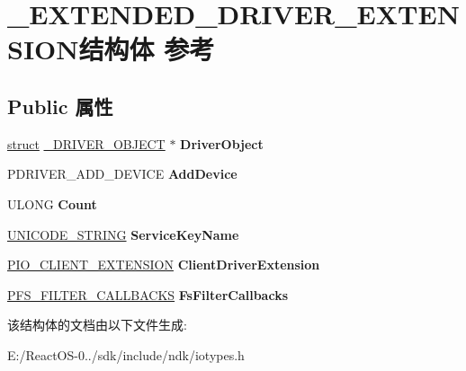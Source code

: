\hypertarget{struct___e_x_t_e_n_d_e_d___d_r_i_v_e_r___e_x_t_e_n_s_i_o_n}{}\section{\+\_\+\+E\+X\+T\+E\+N\+D\+E\+D\+\_\+\+D\+R\+I\+V\+E\+R\+\_\+\+E\+X\+T\+E\+N\+S\+I\+O\+N结构体 参考}
\label{struct___e_x_t_e_n_d_e_d___d_r_i_v_e_r___e_x_t_e_n_s_i_o_n}
\subsection*{Public 属性}
\begin{DoxyCompactItemize}
\item 
\mbox{\label{struct___e_x_t_e_n_d_e_d___d_r_i_v_e_r___e_x_t_e_n_s_i_o_n_aedc5d7256e7f0bcfb8a95cfa5c8cd61e}} 
\hyperlink{interfacestruct}{struct} \hyperlink{struct___d_r_i_v_e_r___o_b_j_e_c_t}{\+\_\+\+D\+R\+I\+V\+E\+R\+\_\+\+O\+B\+J\+E\+CT} $\ast$ {\bfseries Driver\+Object}
\item 
\mbox{\label{struct___e_x_t_e_n_d_e_d___d_r_i_v_e_r___e_x_t_e_n_s_i_o_n_ae2adf99c5f58ac6794d9f736a7b7345d}} 
P\+D\+R\+I\+V\+E\+R\+\_\+\+A\+D\+D\+\_\+\+D\+E\+V\+I\+CE {\bfseries Add\+Device}
\item 
\mbox{\label{struct___e_x_t_e_n_d_e_d___d_r_i_v_e_r___e_x_t_e_n_s_i_o_n_a3b80b7eeec3569eb4e3c4ef079176b1c}} 
U\+L\+O\+NG {\bfseries Count}
\item 
\mbox{\label{struct___e_x_t_e_n_d_e_d___d_r_i_v_e_r___e_x_t_e_n_s_i_o_n_afbf0324b233284bc1b492b0794da202a}} 
\hyperlink{struct___u_n_i_c_o_d_e___s_t_r_i_n_g}{U\+N\+I\+C\+O\+D\+E\+\_\+\+S\+T\+R\+I\+NG} {\bfseries Service\+Key\+Name}
\item 
\mbox{\label{struct___e_x_t_e_n_d_e_d___d_r_i_v_e_r___e_x_t_e_n_s_i_o_n_a14ee532a6c312d54ff7cf39b3f165396}} 
\hyperlink{struct___i_o___c_l_i_e_n_t___e_x_t_e_n_s_i_o_n}{P\+I\+O\+\_\+\+C\+L\+I\+E\+N\+T\+\_\+\+E\+X\+T\+E\+N\+S\+I\+ON} {\bfseries Client\+Driver\+Extension}
\item 
\mbox{\label{struct___e_x_t_e_n_d_e_d___d_r_i_v_e_r___e_x_t_e_n_s_i_o_n_ab9f10521837690bfcef42aaf5309a728}} 
\hyperlink{struct___f_s___f_i_l_t_e_r___c_a_l_l_b_a_c_k_s}{P\+F\+S\+\_\+\+F\+I\+L\+T\+E\+R\+\_\+\+C\+A\+L\+L\+B\+A\+C\+KS} {\bfseries Fs\+Filter\+Callbacks}
\end{DoxyCompactItemize}


该结构体的文档由以下文件生成\+:\begin{DoxyCompactItemize}
\item 
E\+:/\+React\+O\+S-\/0../sdk/include/ndk/iotypes.\+h\end{DoxyCompactItemize}
